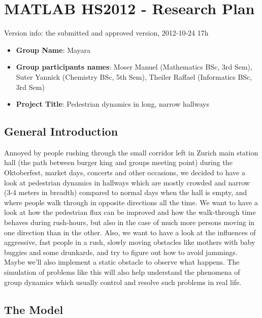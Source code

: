 
\section{MATLAB HS2012 - Research Plan}

Version info: the submitted and approved version, 2012-10-24 17h\\

\begin{itemize}
 \item \textbf{Group Name}: Mayara
 \item \textbf{Group participants names}: Moser Manuel (Mathematics BSc, 3rd Sem), Suter Yannick (Chemistry BSc, 5th Sem), Theiler Raffael (Informatics BSc, 3rd Sem)
 \item \textbf{Project Title}: Pedestrian dynamics in long, narrow hallways
\end{itemize} 

\subsection*{General Introduction}

Annoyed by people rushing through the small corridor left in Zurich main station hall (the path between burger king and groups meeting point) during the Oktoberfest, market days, concerts and other occasions, we decided to have a look at pedestrian dynamics in hallways which are mostly crowded and narrow (3-4 meters in breadth) compared to normal days when the hall is empty, and where people walk through in opposite directions all the time. We want to have a look at how the pedestrian flux can be improved and how the walk-through time behaves during rush-hours, but also in the case of much more persons moving in one direction than in the other. Also, we want to have a look at the influences of aggressive, fast people in a rush, slowly moving obstacles like mothers with baby buggies and some drunkards, and try to figure out how to avoid jammings. Maybe we'll also implement a static obstacle to observe what happens. The simulation of problems like this will also help understand the phenomena of group dynamics which usually control and resolve such problems in real life.

\subsection*{The Model}

